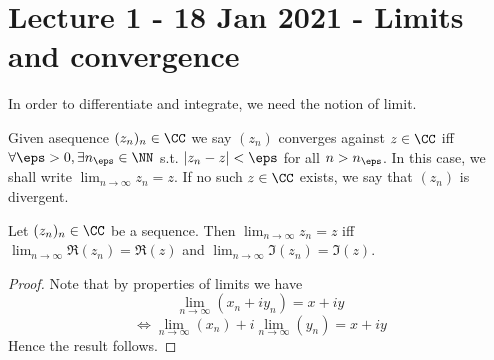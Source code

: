 \section{Lecture 1 - 18 Jan 2021 - Limits and convergence}
In order to differentiate and integrate, we need the notion of limit.
\begin{definition}
  Given asequence $(z_n)_n\in\CC$ we say $(z_n)$ converges against $z\in\CC$ iff
  $\forall \eps>0, \exists n_{\eps}\in\NN$ s.t. $|z_n-z|<\eps$ for all
  $n>n_{\eps}$. In this case, we shall write $\lim_{n\to\infty} z_n=z$. If no
  such $z\in\CC$ exists, we say that $(z_n)$ is divergent.
  \label{def:sequenceCC}
\end{definition}
\begin{proposition}
  Let $(z_n)_n\in\CC$ be a sequence. Then $\lim_{n\to\infty} z_n=z$ iff
  $\lim_{n\to\infty} \Re(z_n)=\Re(z)$ and $\lim_{n\to\infty} \Im(z_n)=\Im(z)$.
\end{proposition}
\begin{proof}
  Note that by properties of limits we have 
  \[\lim_{n\to\infty}(x_n + iy_n) = x+iy\]
  \[\iff \lim_{n\to\infty}(x_n) + i\lim_{n\to\infty}(y_n) = x+iy\]
  Hence the result follows.
\end{proof}

